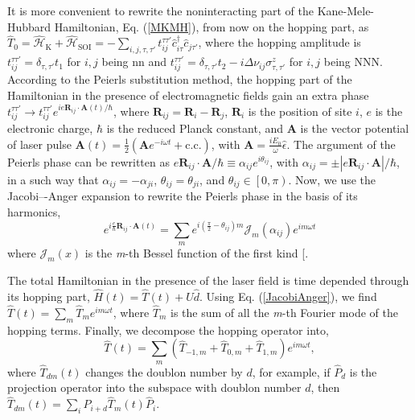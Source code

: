 \documentclass[aps,prl,twocolumn,amsmath,amssymb,nobibnotes]{revtex4-1}%
\renewcommand{\cite}[1]{{[}\onlinecite{#1}{]}}
\newcommand{\bs}{\boldsymbol}
\begin{document}
It is more convenient to rewrite the noninteracting part of the Kane-Mele-Hubbard Hamiltonian, Eq. (\ref{MKMH}), from now on the hopping part, as $\hat{T}_0=\hat{\mathcal{H}}_{\text{K}}+\hat{\mathcal{H}}_{\text{SOI}} = - \sum_{i,j , \tau, \tau'}
t_{ij}^{\tau\tau'} \hat{c}_{i \tau}^\dagger \hat{c}_{j \tau'}$, where the hopping amplitude is $t_{ij}^{\tau\tau'} = \delta_{\tau,\tau'}t_1$ for $i,j$ being nn and $t_{ij}^{\tau\tau'} = \delta_{\tau,\tau'}t_2 - i\Delta\nu_{ij}\sigma^z_{\tau, \tau'}$ for $i,j$ being NNN.
According to the Peierls substitution method, the hopping part of the Hamiltonian in the presence of electromagnetic fields gain an extra phase $t_{ij}^{\tau\tau'}\rightarrow t_{ij}^{\tau\tau'} e^{{i e \bs{R}_{ij} \cdot \bs{A}(t)}/\hbar}$, where $\bs{R}_{ij} = \bs{R}_i-\bs{R}_j$, $\bs{R}_i$ is the position of site $i$, $e$ is the electronic charge, $\hbar$ is the reduced Planck constant, and $\bs{A}$ is the vector potential of laser pulse $\bs{A}(t) = \frac{1}{2}(\bs{A} e^{-i\omega t} + \mathrm{c.c.})$, with $\bs{A} = \frac{iE_0}{\omega}\hat{\epsilon}$.
The argument of the Peierls phase can be rewritten as $e\bs{R}_{ij}\cdot\bs{A}/\hbar \equiv \alpha_{ij} e^{i \theta_{ij}}$, with $\alpha_{ij} = \pm|e\bs{R}_{ij}\cdot \bs{A}|/\hbar$, in a such way that $\alpha_{ij}= -\alpha_{ji}$, $\theta_{ij}= \theta_{ji}$, and $\theta_{ij} \in \left[0,\pi\right)$.
Now, we use the Jacobi–-Anger expansion to rewrite the Peierls phase in the basis of its harmonics,
\begin{equation}
\label{JacobiAnger}
e^{i\frac{e}{\hbar}\bs{R}_{ij}\cdot\bs{A}(t)} = \sum_m e^{i(\frac{\pi}{2}-\theta_{ij})m} \mathcal{J}_m(\alpha_{ij}) e^{im\omega t}
\end{equation}
where $\mathcal{J}_m(x)$ is the \textit{m}-th Bessel function of the first kind \cite{Kitamura2017}.

The total Hamiltonian in the presence of the laser field is time depended through its hopping part, $\hat{H}(t) = \hat{T}(t) +  U\hat{d}$. Using Eq. (\ref{JacobiAnger}), we find $\hat{T}(t) = \sum_m \hat{T}_m e^{im \omega t}$, where $\hat{T}_m$ is the sum of all the \textit{m}-th Fourier mode of the hopping terms. Finally, we decompose the hopping operator into,
\begin{equation}
\hat{T}(t) = \sum_m (\hat{T}_{-1,m}+\hat{T}_{0,m}+\hat{T}_{1,m})e^{im\omega t},
\end{equation}
where $\hat{T}_{dm}(t)$ changes the doublon number by $d$, for example, if $\hat{P}_d$ is the projection operator into the subspace with doublon number $d$, then $\hat{T}_{dm}(t) = \sum_i \hat{P}_{i+d}\hat{T}_{m}(t)\hat{P}_i$.
\end{document}
